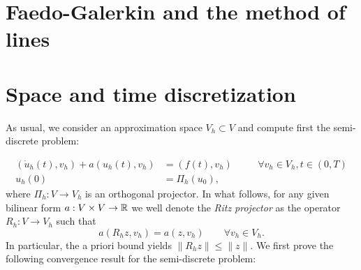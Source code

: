 \section{Faedo-Galerkin and the method of lines}

\section{Space and time discretization}
As usual, we consider an approximation space $V_h\subset V$  and compute first the semi-discrete problem: 

\begin{equation}\label{eq:semi-discrete in time}
    \begin{aligned}
        (\dot u_h(t), v_h) + a(u_h(t), v_h) &= (f(t),v_h) &&\quad \forall v_h\in V_h, t \in(0,T)  \\
                                u_h(0)&= \Pi_h(u_0), 
    \end{aligned}
\end{equation}
where $\Pi_h:V\to V_h$ is an orthogonal projector. In what follows, for any given bilinear form $a:V\times V\to \mathbb{R}$ we well denote the \emph{Ritz projector} as the operator $R_h:V\to V_h$ such that 
\begin{equation}
    a(R_h z, v_h) = a(z, v_h) \qquad \forall v_h \in V_h.
\end{equation}
In particular, the a priori bound yields $\|R_h z \| \leq \| z \|$.  We first prove the following convergence result for the semi-discrete problem:
